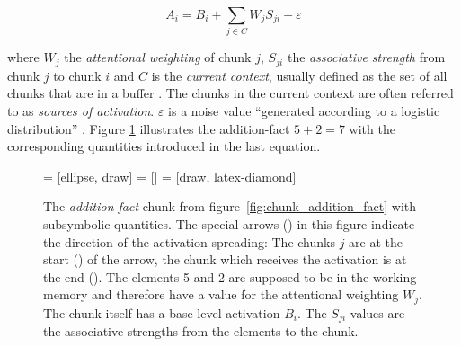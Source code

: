 \begin{equation}
\label{eq:activation_equation}
 A_i = B_i + \sum_{j \in C}{W_j S_{ji}} + \varepsilon
\end{equation}

where $W_j$ the \emph{attentional weighting} of chunk $j$, $S_{ji}$ the \emph{associative strength} from chunk $j$ to chunk $i$ and $C$ is the \emph{current context}\label{current_context}, usually defined as the set of all chunks that are in a buffer \cites[1042]{anderson_integrated_2004}[33]{taatgen_modeling_2006}[unit 5]{actr_tutorial}. The chunks in the current context are often referred to as \emph{sources of activation}. $\varepsilon$ is a noise value ``generated according to a logistic distribution'' \cite[unit 4, p. 4]{actr_tutorial}. Figure \ref{fig:chunk_activation} illustrates the addition-fact $5 + 2 = 7$ with the corresponding quantities introduced in the last equation. 

\begin{figure}[htb]
\centering
{} = [ellipse, draw]
 = [] 
 = [draw, latex-diamond]   

\caption[The \emph{addition-fact} chunk from figure~\ref{fig:chunk_addition_fact} with subsymbolic quantities.]
{The \emph{addition-fact} chunk from figure~\ref{fig:chunk_addition_fact} with subsymbolic quantities. The special arrows () in this figure indicate the direction of the activation spreading: The chunks $j$ are at the start () of the arrow, the chunk which receives the activation is at the end (). The elements 5 and 2 are supposed to be in the working memory and therefore have a value for the attentional weighting $W_j$. The chunk itself has a base-level activation $B_i$. The $S_{ji}$ values are the associative strengths from the elements to the chunk. \cite[fig.~5]{anderson_integrated_2004}}
\label{fig:chunk_activation}
\end{figure}

